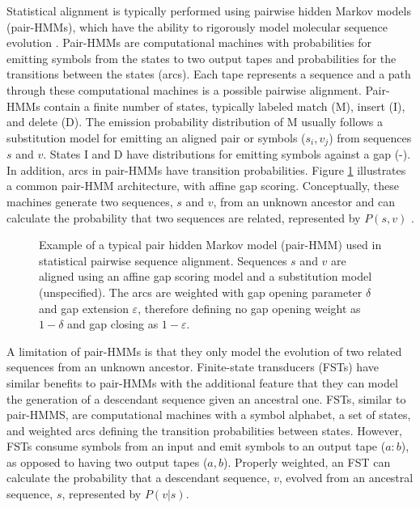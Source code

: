 Statistical alignment is typically performed using pairwise hidden Markov models (pair-HMMs), which have the ability to rigorously model molecular sequence evolution \citep{bradley2007transducers}.
Pair-HMMs are computational machines with probabilities for emitting symbols from the states to two output tapes and probabilities for the transitions between the states (arcs). Each tape represents a sequence and a path through these computational machines is a possible pairwise alignment. Pair-HMMs contain a finite number of states, typically labeled match (M), insert (I), and delete (D). The emission probability distribution of M usually follows a substitution model for emitting an aligned pair or symbols ($s_i,v_j$) from sequences $s$ and $v$. States I and D have distributions for emitting symbols against a gap (-). In addition, arcs in pair-HMMs have transition probabilities. Figure \ref{fig:hmm} illustrates a common pair-HMM architecture, with affine gap scoring. Conceptually, these machines generate two sequences, $s$ and $v$, from an unknown ancestor and can calculate the probability that two sequences are related, represented by $P(s, v)$ \citep{yoon_2009_hmm}.

\clearpage

\begin{figure}[!ht]
    \centering
    \resizebox{0.8\textwidth}{!}{}
    \caption[Pair-HMM]{Example of a typical pair hidden Markov model (pair-HMM) used in statistical pairwise sequence alignment. Sequences $s$ and $v$ are aligned using an affine gap scoring model and a substitution model (unspecified). The arcs are weighted with gap opening parameter $\delta$ and gap extension $\varepsilon$, therefore defining no gap opening weight as $1-\delta$ and gap closing as $1-\varepsilon$.}
    \label{fig:hmm}
\end{figure}

A limitation of pair-HMMs is that they only model the evolution of two related sequences from an unknown ancestor.
Finite-state transducers (FSTs) have similar benefits to pair-HMMs with the additional feature that they can model the generation of a descendant sequence given an ancestral one.
FSTs, similar to pair-HMMS, are computational machines with a symbol alphabet, a set of states, and weighted arcs defining the transition probabilities between states. However, FSTs consume symbols from an input and emit symbols to an output tape ($a:b$), as opposed to having two output tapes ($a,b$). Properly weighted, an FST can calculate the probability that a descendant sequence, $v$, evolved from an ancestral sequence, $s$, represented by $P(v | s)$.

